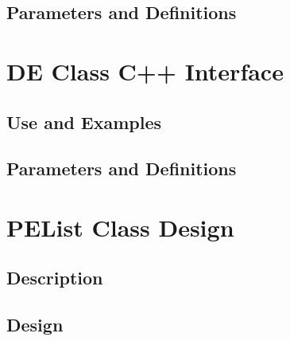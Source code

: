 \documentclass[]{article}
\begin{document}
%


\subsection{Parameters and Definitions}

%



%


\section{DE Class C++ Interface}

\subsection{Use and Examples}




\subsection{Parameters and Definitions}

%







\section{PEList Class Design}

\subsection{Description}




\subsection{Design}


\end{document}
